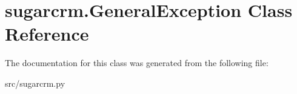 \hypertarget{classsugarcrm_1_1_general_exception}{
\section{sugarcrm.GeneralException Class Reference}
\label{classsugarcrm_1_1_general_exception}
}


The documentation for this class was generated from the following file:\begin{DoxyCompactItemize}
\item 
src/sugarcrm.py\end{DoxyCompactItemize}
